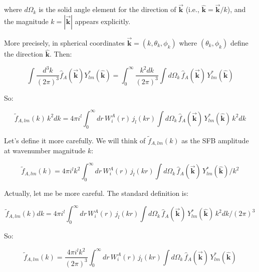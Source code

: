 where $d\Omega_k$ is the solid angle element for the direction of $\vec{\mathbf{k}}$ (i.e., $\hat{\mathbf{k}} = \vec{\mathbf{k}}/k$), and the magnitude $k = |\vec{\mathbf{k}}|$ appears explicitly.

More precisely, in spherical coordinates $\vec{\mathbf{k}} = (k, \theta_k, \phi_k)$ where $(\theta_k, \phi_k)$ define the direction $\hat{\mathbf{k}}$. Then:

\begin{equation}
    \int \frac{d^3k}{(2\pi)^3} \hat{f}_A(\vec{\mathbf{k}}) Y_{lm}^*(\hat{\mathbf{k}}) = \int_0^{\infty} \frac{k^2 dk}{(2\pi)^3} \int d\Omega_k \, \hat{f}_A(\vec{\mathbf{k}}) \, Y_{lm}^*(\hat{\mathbf{k}})
\label{eq:fourier_spherical}
\end{equation}

So:

\begin{equation}
    \tilde{f}_{A,lm}(k) \, k^2 dk = 4\pi i^{l} \int_0^{\infty} dr \, W_i^A(r) \, j_{l}(kr) \int d\Omega_k \, \hat{f}_A(\vec{\mathbf{k}}) \, Y_{lm}^*(\hat{\mathbf{k}}) \, k^2 dk
\label{eq:sfb_coeff_A_element}
\end{equation}

Let's define it more carefully. We will think of $\tilde{f}_{A,lm}(k)$ as the SFB amplitude at wavenumber magnitude $k$:

\begin{equation}
    \tilde{f}_{A,lm}(k) = 4\pi i^{l} k^2 \int_0^{\infty} dr \, W_i^A(r) \, j_{l}(kr) \int d\Omega_k \, \hat{f}_A(\vec{\mathbf{k}}) \, Y_{lm}^*(\hat{\mathbf{k}}) / k^2
\label{eq:sfb_coeff_A_definition}
\end{equation}

Actually, let me be more careful. The standard definition is:

\begin{equation}
    \tilde{f}_{A,lm}(k) dk = 4\pi i^{l} \int_0^{\infty} dr \, W_i^A(r) \, j_{l}(kr) \int d\Omega_k \, \hat{f}_A(\vec{\mathbf{k}}) \, Y_{lm}^*(\hat{\mathbf{k}}) \, k^2 dk / (2\pi)^3
\label{eq:sfb_coeff_normalized}
\end{equation}

So:

\begin{equation}
    \tilde{f}_{A,lm}(k) = \frac{4\pi i^{l} k^2}{(2\pi)^3} \int_0^{\infty} dr \, W_i^A(r) \, j_{l}(kr) \int d\Omega_k \, \hat{f}_A(\vec{\mathbf{k}}) \, Y_{lm}^*(\hat{\mathbf{k}})
\label{eq:sfb_coeff_A_k}
\end{equation}

